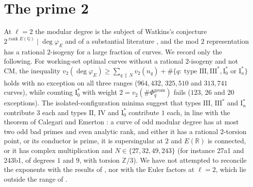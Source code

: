 \documentclass[11pt]{amsart}
\theoremstyle{definition}
\newcommand{\Q}{\mathbb{Q}}
\newcommand{\Z}{\mathbb{Z}}
\newcommand{\R}{\mathbb{R}}
\newcommand{\degphi}{\deg\varphi_E}
\newcommand{\Phig}{\Phi^{\mathrm{geom}}}
\begin{document}
\section{The prime 2}\label{sec:two}
At $\ell=2$ the modular degree is the subject of Watkins's conjecture $2^{\operatorname{rank}E(\Q)}\mid\degphi$ \cite{Watkins02} and of a substantial literature \cite{Dummigan06,CalegariEmerton09,Yazdani11,CaroPasten22,HatleyKundu,BKP}, and the mod $2$ representation has a rational $2$-isogeny for a large fraction of curves. We record only the following. For working-set optimal curves without a rational $2$-isogeny and not CM, the inequality $v_2(\degphi)\ge\sum_{q\,\|\,N}v_2(n_q)+\#\{q:\ \text{type }\mathrm{III},\mathrm{III}^*,\mathrm{I}_0^*\text{ or }\mathrm{I}_n^*\}$ holds with no exception on all three ranges ($964{,}432$, $325{,}510$ and $313{,}741$ curves), while counting $\mathrm{I}_0^*$ with weight $2=v_2(\#\Phig_q)$ fails ($123$, $26$ and $20$ exceptions). The isolated-configuration minima suggest that types $\mathrm{III}$, $\mathrm{III}^*$ and $\mathrm{I}_n^*$ contribute $3$ each and types $\mathrm{II}$, $\mathrm{IV}$ and $\mathrm{I}_0^*$ contribute $1$ each, in line with the theorem of Calegari and Emerton \cite{CalegariEmerton09}: a curve of odd modular degree has at most two odd bad primes and even analytic rank, and either it has a rational $2$-torsion point, or its conductor is prime, it is supersingular at $2$ and $E(\R)$ is connected, or it has complex multiplication and $N\in\{27,32,49,243\}$ (for instance 27a1 and 243b1, of degrees $1$ and $9$, with torsion $\Z/3$). We have not attempted to reconcile the exponents with the results of \cite{Dummigan06,CaroPasten22,HatleyKundu,BKP}, nor with the Euler factors at $\ell=2$, which lie outside the range of \cite{DFG04}.
\end{document}
